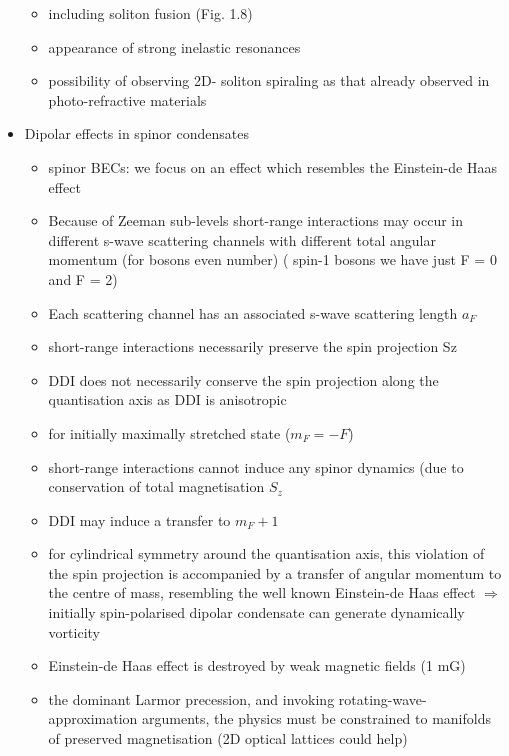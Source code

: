 \begin{itemize}
        \begin{itemize}
          \item including soliton fusion (Fig. 1.8)
          \item appearance of strong inelastic resonances
          \item possibility of observing 2D- soliton spiraling as that already observed in photo-refractive materials
        \end{itemize}

        \item Dipolar effects in spinor condensates
        \begin{itemize}
            \item spinor BECs: we focus on an effect which resembles the Einstein-de Haas effect
            \item Because of Zeeman sub-levels short-range interactions may occur in different s-wave scattering channels with different total angular momentum (for bosons even number) ( spin-1 bosons we have just F = 0 and F = 2)
            \item Each scattering channel has an associated s-wave scattering length $a_{F}$
            \item short-range interactions necessarily preserve the spin projection Sz
            \item DDI does not necessarily conserve the spin projection along the quantisation axis as DDI is anisotropic
            \item for initially maximally stretched state ($m_{F} =  - F$)
            \item short-range interactions cannot induce any spinor dynamics (due to conservation of total magnetisation $S_{z}$
            \item DDI may induce a transfer to $m_{F} + 1$
            \item for cylindrical symmetry around the quantisation axis, this violation of the spin projection is accompanied by a transfer of angular momentum to the centre of mass, resembling the well known Einstein-de Haas effect $\Rightarrow$ initially spin-polarised dipolar condensate can generate dynamically vorticity
            \item Einstein-de Haas effect is destroyed by weak magnetic fields (1 mG)
            \item the dominant Larmor precession, and invoking rotating-wave-approximation arguments, the physics must be constrained to manifolds of preserved magnetisation (2D optical lattices could help)

\end{itemize}
\end{itemize}
